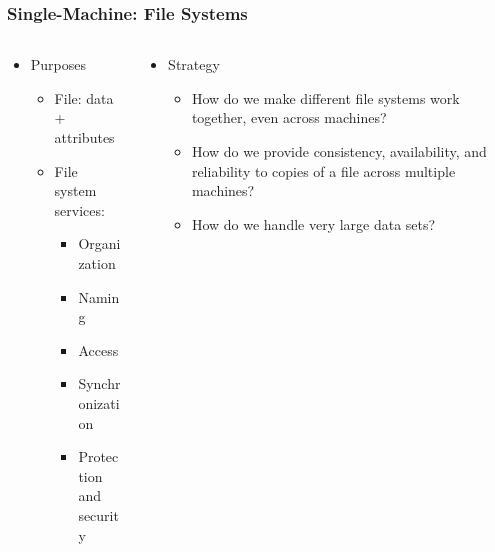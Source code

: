\begin{frame}[plain,t]
	\frametitle{Single-Machine: File Systems}
	\begin{columns}[t]
		\begin{column}{.5\textwidth}
			
			\begin{itemize}\Large
				\item Purposes
				\begin{itemize}\large
					\item File: data + attributes
					\item File system services:
					\begin{itemize}\large
						\item Organization
						\item Naming
						\item Access
						\item Synchronization
						\item Protection and security
	
					\end{itemize}					
				\end{itemize}
			\end{itemize}
			
		\end{column}\pause
		
		\begin{column}{.5\textwidth}
			
			\begin{itemize}\Large
				\item Strategy
				\begin{itemize}\large
					\item How do we make different file
					systems work together, even across
					machines?
					\item How do we provide consistency,
					availability, and reliability to copies
					of a file across multiple machines?
					\item How do we handle very large data
					sets?
					
				\end{itemize}
			\end{itemize}
			
		\end{column}
	\end{columns}
\end{frame}


